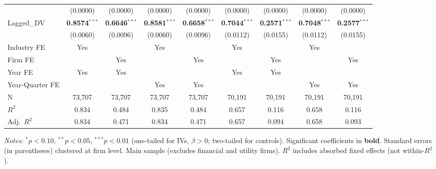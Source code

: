 \documentclass[11pt,a4paper]{article}
\begin{document}
\begin{table}[htbp]
\begin{tabular}{lcccccccc}
 & (0.0000) & (0.0000) & (0.0000) & (0.0000) & (0.0000) & (0.0000) & (0.0000) & (0.0000) \\
Lagged\_DV & \textbf{0.8574}$^{***}$ & \textbf{0.6646}$^{***}$ & \textbf{0.8581}$^{***}$ & \textbf{0.6658}$^{***}$ & \textbf{0.7044}$^{***}$ & \textbf{0.2571}$^{***}$ & \textbf{0.7048}$^{***}$ & \textbf{0.2577}$^{***}$ \\
 & (0.0060) & (0.0096) & (0.0060) & (0.0096) & (0.0112) & (0.0155) & (0.0112) & (0.0155) \\
\midrule
Industry FE & Yes &  & Yes &  & Yes &  & Yes &  \\
Firm FE &  & Yes &  & Yes &  & Yes &  & Yes \\
Year FE & Yes & Yes &  &  & Yes & Yes &  &  \\
Year-Quarter FE &  &  & Yes & Yes &  &  & Yes & Yes \\
\midrule
N & 73,707 & 73,707 & 73,707 & 73,707 & 70,191 & 70,191 & 70,191 & 70,191 \\
$R^2$ & 0.834 & 0.484 & 0.835 & 0.484 & 0.657 & 0.116 & 0.658 & 0.116 \\
Adj.~$R^2$ & 0.834 & 0.471 & 0.834 & 0.471 & 0.657 & 0.094 & 0.658 & 0.093 \\
\bottomrule
\end{tabular}
\begin{minipage}{\linewidth}
\vspace{2pt}\scriptsize
\textit{Notes:} $^{*}p<0.10$, $^{**}p<0.05$, $^{***}p<0.01$ (one-tailed for IVs, $\beta > 0$; two-tailed for controls).
 Significant coefficients in \textbf{bold}.
 Standard errors (in parentheses) clustered at firm level.
 Main sample (excludes financial and utility firms).
 $R^2$ includes absorbed fixed effects (not within-$R^2$).
\end{minipage}
\end{table}
\clearpage
\end{document}
